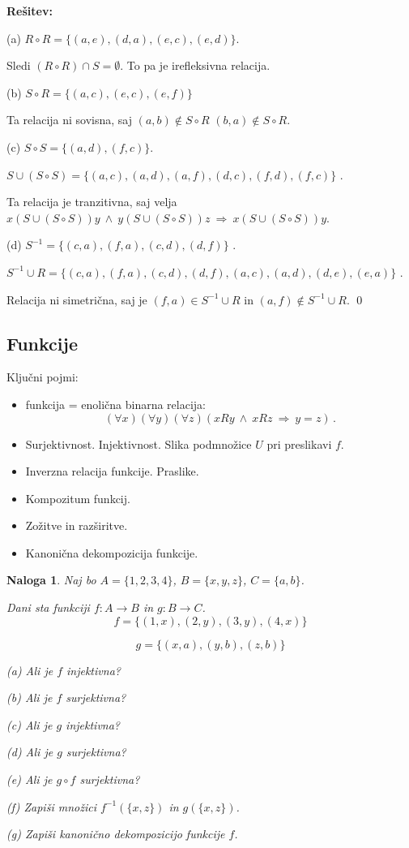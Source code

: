 \documentclass[11pt,paper=b5,footinclude,headinclude]{scrbook} %
\def\inn {{~\wedge~}}
\def\sledi {{~\Rightarrow~}}
\newtheorem*{problem}{Naloga}
\begin{document}
\textbf{Rešitev:}

(a)
$R\circ R = \{(a,e), (d,a), (e,c), (e,d)\}$.

Sledi
$(R\circ R)\cap S = \emptyset$. To pa je irefleksivna relacija.

(b) $S\circ R = \{(a,c), (e,c), (e,f)\}$

Ta relacija ni sovisna, saj $(a,b)\not\in S\circ R$
$(b,a)\not\in S\circ R$.

(c)
$S\circ S = \{(a,d), (f,c)\}$.

$S\cup (S\circ S)= \{(a, c), (a,d), (a, f), (d, c), (f, d), (f,c)\}$ .

Ta relacija je tranzitivna, saj velja $x(S\cup (S\circ S))y\inn
y(S\cup (S\circ S))z\sledi x(S\cup (S\circ S))y$.

(d)
$S^{-1} = \{(c, a), (f, a), (c, d), (d, f)\}$ .

$S^{-1}\cup R = \{(c, a), (f, a), (c, d), (d, f),
(a, c), (a, d), (d, e), (e, a)\}$ .

Relacija ni simetrična, saj je $(f,a)\in S^{-1}\cup R$ in $(a,f)\not\in S^{-1}\cup R$.
\qed


\subsection{Funkcije}

Ključni pojmi:
\begin{itemize}
  \item funkcija = enolična binarna relacija:
  $$(\forall x)(\forall y)(\forall z)(xRy\inn xRz\sledi y = z)\,.$$
  \item Surjektivnost. Injektivnost. Slika podmnožice $U$ pri preslikavi $f$.
  \item Inverzna relacija funkcije. Praslike.
  \item Kompozitum funkcij.
  \item Zožitve in razširitve.
  \item Kanonična dekompozicija funkcije.
\end{itemize}

\begin{problem}
Naj bo $A = \{1,2,3,4\}$, $B = \{x,y,z\}$, $C = \{a,b\}$.

Dani sta funkciji $f:A\to B$ in $g:B\to C$.
$$f = \{(1,x),(2,y),(3,y),(4,x)\}$$

$$g = \{(x,a),(y,b),(z,b)\}$$

(a) Ali je $f$ injektivna?

(b) Ali je $f$ surjektivna?

(c) Ali je $g$ injektivna?

(d) Ali je $g$ surjektivna?

(e) Ali je $g\circ f$ surjektivna?

(f) Zapiši množici $f^{-1}(\{x,z\})$ in $g(\{x,z\})$.

(g) Zapiši kanonično dekompozicijo funkcije $f$.
\end{problem}
\end{document}
